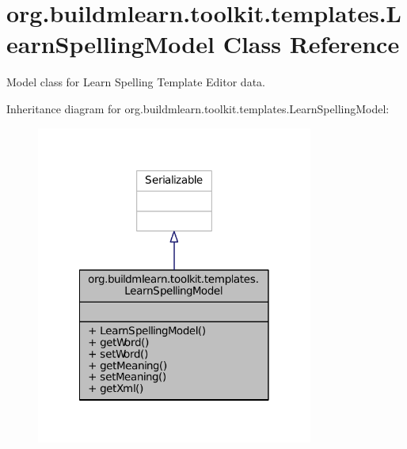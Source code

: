 \hypertarget{classorg_1_1buildmlearn_1_1toolkit_1_1templates_1_1LearnSpellingModel}{\section{org.\-buildmlearn.\-toolkit.\-templates.\-Learn\-Spelling\-Model Class Reference}
\label{classorg_1_1buildmlearn_1_1toolkit_1_1templates_1_1LearnSpellingModel}
}


Model class for Learn Spelling Template Editor data.  




Inheritance diagram for org.\-buildmlearn.\-toolkit.\-templates.\-Learn\-Spelling\-Model\-:
\nopagebreak
\begin{figure}[H]
\begin{center}
\leavevmode
\includegraphics[width=258pt]{d7/de3/classorg_1_1buildmlearn_1_1toolkit_1_1templates_1_1LearnSpellingModel__inherit__graph}
\end{center}
\end{figure}


